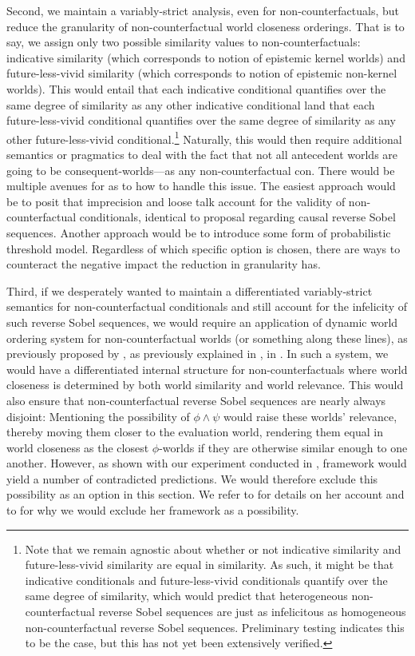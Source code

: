 Second, we maintain a variably-strict analysis, even for non-counterfactuals, but reduce the granularity of non-counterfactual world closeness orderings. That is to say, we assign only two possible similarity values to non-counterfactuals: indicative similarity (which corresponds to  notion of epistemic kernel worlds) and future-less-vivid similarity (which corresponds to  notion of epistemic non-kernel worlds). This would entail that each indicative conditional quantifies over the same degree of similarity as any other indicative conditional land that each future-less-vivid conditional quantifies over the same degree of similarity as any other future-less-vivid conditional.\footnote{Note that we remain agnostic about whether or not indicative similarity and future-less-vivid similarity are equal in similarity. As such, it might be that indicative conditionals and future-less-vivid conditionals quantify over the same degree of similarity, which would predict that heterogeneous non-counterfactual reverse Sobel sequences are just as infelicitous as homogeneous non-counterfactual reverse Sobel sequences. Preliminary testing indicates this to be the case, but this has not yet been extensively verified.} Naturally, this would then require additional semantics or pragmatics to deal with the fact that not all antecedent worlds are going to be consequent-worlds---as any non-counterfactual con. There would be multiple avenues for as to how to handle this issue. The easiest approach would be to posit that imprecision and loose talk account for the validity of non-counterfactual conditionals, identical to  proposal regarding causal reverse Sobel sequences. Another approach would be to introduce some form of probabilistic threshold model. Regardless of which specific option is chosen, there are ways to counteract the negative impact the reduction in granularity has.

Third, if we desperately wanted to maintain a differentiated variably-strict semantics for non-counterfactual conditionals and still account for the infelicity of such reverse Sobel sequences, we would require an application of  dynamic world ordering system for non-counterfactual worlds (or something along these lines), as previously proposed by \textcite{Krassnig2017}, as previously explained in , in . In such a system, we would have a differentiated internal structure for non-counterfactuals where world closeness is determined by both world similarity and world relevance. This would also ensure that non-counterfactual reverse Sobel sequences are nearly always disjoint: Mentioning the possibility of $\phi\land\psi$ would raise these worlds' relevance, thereby moving them closer to the evaluation world, rendering them equal in world closeness as the closest $\phi$-worlds if they are otherwise similar enough to one another. However, as shown with our experiment conducted in ,  framework would yield a number of contradicted predictions. We would therefore exclude this possibility as an option in this section. We refer to  for details on her account and to  for why we would exclude her framework as a possibility.

